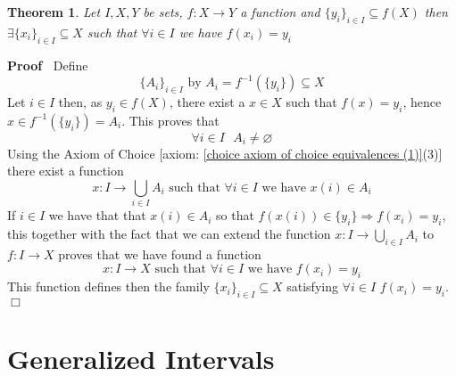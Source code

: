 \documentclass{book}
\newenvironment{proof}{\noindent\textbf{Proof\ }}{\hspace*{\fill}$\Box$\medskip}
\newtheorem{theorem}{Theorem}
\begin{document}
\begin{theorem}
  \label{choice family on preimage}Let $I, X, Y$ be sets, $f : X \rightarrow
  Y$ a function and $\{ y_i \}_{i \in I} \subseteq f (X)$ then $\exists \{ x_i
  \}_{i \in I} \subseteq X$ such that $\forall i \in I$ we have $f (x_i) =
  y_i$
\end{theorem}

\begin{proof}
  Define
  \[ \{ A_i \}_{i \in I} \text{ by } A_i = f^{- 1} (\{ y_i \}) \subseteq X \]
  Let $i \in I$ then, as $y_i \in f (X)$, there exist a $x \in X$ such that $f
  (x) = y_i$, hence $x \in f^{- 1} (\{ y_i \}) = A_i$. This proves that
  \[ \forall i \in I \text{ } A_i \neq \varnothing \]
  Using the Axiom of Choice [axiom: \ref{choice axiom of choice equivalences
  (1)}(3)] there exist a function
  \[ x : I \rightarrow \bigcup_{i \in I} A_i \text{ such that } \forall i \in
     I \text{ we have } x (i) \in A_i \]
  If $i \in I$ we have that that $x (i) \in A_i$ so that $f (x (i)) \in \{ y_i
  \} \Rightarrow f (x_i) = y_i$, this together with the fact that we can
  extend the function $x : I \rightarrow \bigcup_{i \in I} A_i$ to $f : I
  \rightarrow X$ proves that we have found a function
  \[ x : I \rightarrow X \text{ such that } \forall i \in I \text{ we have }
     f (x_i) = y_i \]
  This function defines then the family $\{ x_i \}_{i \in I} \subseteq X$
  satisfying $\forall i \in I$ $f (x_i) = y_i$.
\end{proof}

\section{Generalized Intervals}
\end{document}
